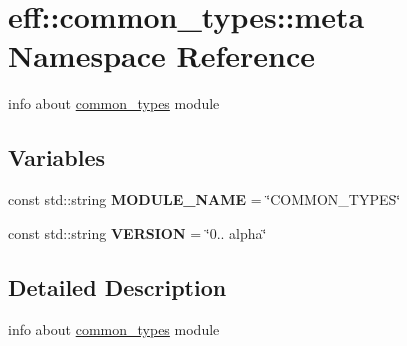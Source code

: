 \hypertarget{namespaceeff_1_1common__types_1_1meta}{}\section{eff\+:\+:common\+\_\+types\+:\+:meta Namespace Reference}
\label{namespaceeff_1_1common__types_1_1meta}


info about \hyperlink{namespaceeff_1_1common__types}{common\+\_\+types} module  


\subsection*{Variables}
\begin{DoxyCompactItemize}
\item 
\mbox{\label{namespaceeff_1_1common__types_1_1meta_a33207ad51c1ff9a090005b1bb0ba8e76}} 
const std\+::string {\bfseries M\+O\+D\+U\+L\+E\+\_\+\+N\+A\+ME} = \char`\"{}C\+O\+M\+M\+O\+N\+\_\+\+T\+Y\+P\+ES\char`\"{}
\item 
\mbox{\label{namespaceeff_1_1common__types_1_1meta_a550f2b129eacd8092221a3abd2f1af9a}} 
const std\+::string {\bfseries V\+E\+R\+S\+I\+ON} = \char`\"{}0.. alpha\char`\"{}
\end{DoxyCompactItemize}


\subsection{Detailed Description}
info about \hyperlink{namespaceeff_1_1common__types}{common\+\_\+types} module 